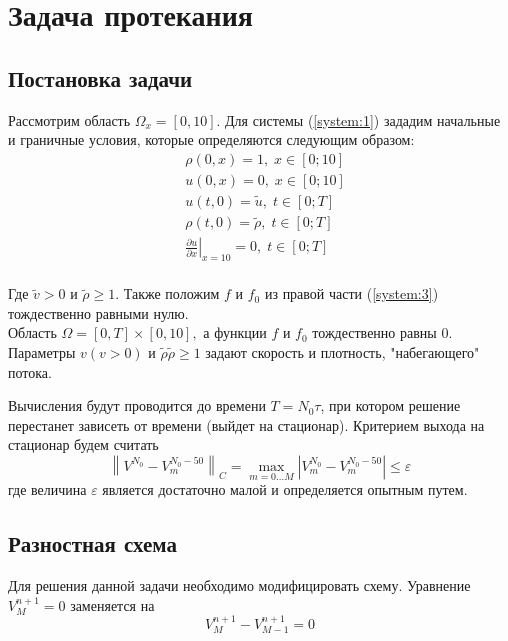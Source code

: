 \section{Задача протекания}

\subsection{Постановка задачи}
Рассмотрим область $\Omega_x = [0,10]$. Для системы (\ref{system:1}) зададим начальные и граничные условия, которые определяются следующим образом:
\begin{equation}
\label{flowout:1}
\begin{aligned}
  & \rho(0, x) = 1, \; x \in [0; 10] \\
  & u(0, x) = 0,    \; x \in [0; 10] \\
  & u(t, 0) = \tilde u, \; t \in [0; T] \\
  & \rho(t, 0) = \tilde \rho, \; t \in [0; T] \\
  & \left.\frac{\partial u}{\partial x}\right|_{x=10} = 0,
   \; t \in [0; T] \\
\end{aligned}
\end{equation}

Где $\tilde v > 0$ и $\tilde \rho \geq 1$. 
Также положим $f$ и $f_0$ из правой части (\ref{system:3}) тождественно равными нулю. \\

Область $\Omega=[0, T] \times[0,10],$ а функции $f$ и $f_{0}$ тождественно равны $0 .$ Параметры $v(v>0)$ и $\tilde{\rho} \tilde{\rho} \geq 1$ задают скорость и плотность, "набегающего" потока.

Вычисления будут проводится до времени $T = N_{0} \tau$, при котором решение перестанет зависеть от времени (выйдет на стационар).
Критерием выхода на стационар будем считать
$$
  \left\| V^{N_{0}} - V_{m}^{N_{0}-50} \right\|_C =
  \max_{m = 0 \dots M} \left| V_{m}^{N_{0}} - V_{m}^{N_{0}-50} \right| 
  \leq \varepsilon
$$
где величина $\varepsilon$ является достаточно малой и определяется опытным путем. \\


\subsection{Разностная схема}
Для решения данной задачи необходимо модифицировать схему. 
Уравнение $V_M^{n+1} = 0$ заменяется на 
$$ V_{M}^{n+1} - V_{M-1}^{n+1} = 0$$

